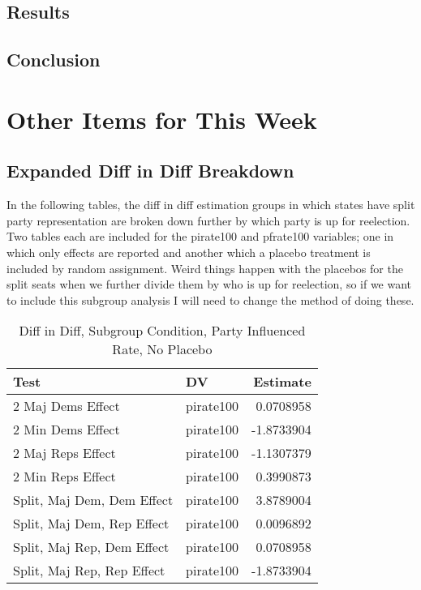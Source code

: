 \documentclass[12pt]{article}
\begin{document}
\subsection{Results}

\subsection{Conclusion}


\section{Other Items for This Week}



\subsection{Expanded Diff in Diff Breakdown}

In the following tables, the diff in diff estimation groups in which states have split party representation are broken down further by which party is up for reelection. Two tables each are included for the pirate100 and pfrate100 variables; one in which only effects are reported and another which a placebo treatment is included by random assignment. Weird things happen with the placebos for the split seats when we further divide them by who is up for reelection, so if we want to include this subgroup analysis I will need to change the method of doing these.

\begin{table}[H]
	\centering
	\caption{Diff in Diff, Subgroup Condition, Party Influenced Rate, No Placebo}
	\begin{tabular}{llr}
		\hline
		Test & DV & Estimate \\ 
		\hline
		2 Maj Dems Effect & pirate100 & 0.0708958 \\  
		2 Min Dems Effect & pirate100 & -1.8733904 \\  
		\hline
		2 Maj Reps Effect & pirate100 & -1.1307379 \\ 
		2 Min Reps Effect & pirate100 & 0.3990873 \\ 
		\hline
		Split, Maj Dem, Dem Effect & pirate100 & 3.8789004 \\ 
		Split, Maj Dem, Rep Effect & pirate100 & 0.0096892 \\  
		\hline
		Split, Maj Rep, Dem Effect & pirate100 & 0.0708958 \\ 
		Split, Maj Rep, Rep Effect & pirate100 & -1.8733904 \\ 
		\hline
	\end{tabular}
\end{table}
\end{document}
